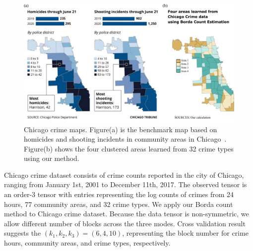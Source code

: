 \documentclass[11pt]{article}
\theoremstyle{definition}
\begin{document}
\begin{figure}[ht!]
    \centering
    \includegraphics[width = \textwidth]{figure/crimecompare.pdf}
    \caption{Chicago crime maps. Figure(a) is the benchmark map based on homicides and shooting incidents in community areas in Chicago~\citep{Jeremy.2020}. Figure(b) shows the four clustered areas learned from 32 crime types using our method.}
    \label{fig:area}
\end{figure}


Chicago crime dataset consists of crime counts reported in the city of Chicago, ranging from January 1st, 2001 to December 11th, 2017. The observed tensor is an order-3 tensor with entries representing the log counts of crimes from 24 hours, 77 community areas, and 32 crime types. We apply our Borda count method to Chicago crime dataset. Because the data tensor is non-symmetric, we allow different number of blocks across the three modes. Cross validation result suggests the $(k_1,k_2,k_3)=(6,4,10)$, representing the block number for crime hours, community areas, and crime types, respectively.
\end{document}
